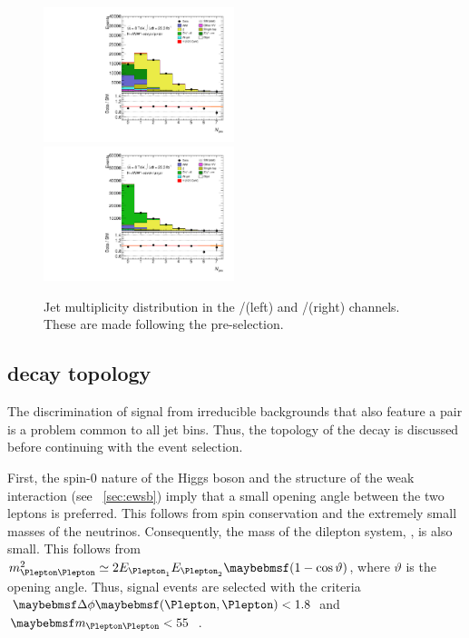 \begin{figure}[t]
	\includegraphics[width=0.495\textwidth]{tex/selection/emme_CutMETRel_m_jet_n_upTo7_mh125_lin}
	\hfill
	\includegraphics[width=0.495\textwidth]{tex/selection/eemm_CutMETRel_m_jet_n_upTo7_mh125_lin}
	\caption{Jet multiplicity distribution in the \emch/\mech (left) and \eech/\mmch (right) 
	channels. These are made following the pre-selection.}
	\label{fig:sel:njets}
\end{figure}



\subsection{\HWWlvlv decay topology}
\label{sec:selection:higgs_decay}

The discrimination of \HWW signal from irreducible backgrounds that also feature a \WW pair 
is a problem common to all jet bins. Thus, the topology of the \HWWlvlv decay is discussed 
before continuing with the event selection.

First, the spin-0 nature of the Higgs boson and the \VminusA structure of the weak 
interaction (see \Section~\ref{sec:ewsb}) imply that a small opening angle between the 
two leptons is preferred. This follows from spin conservation and the extremely small 
masses of the neutrinos. Consequently, the mass of the dilepton system, \mll, is also 
small. This follows from $m_{\Plepton\Plepton}^2 \simeq 2 E_{\Plepton_1} E_{\Plepton_2} 
\parenths{1 - \cos\vartheta}$, where $\vartheta$ is the opening angle. Thus, signal events 
are selected with the criteria $\dphill < 1.8$ and \unit{$\mll < 55$}{\GeV}.

